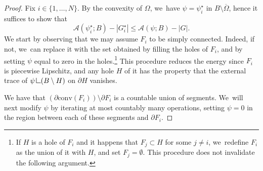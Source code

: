 \documentclass[11pt]{article}
\numberwithin{equation}{section}
\newcommand{\resa}{\mathop{\hbox{\vrule height 7pt width 0.5pt depth 0pt
\vrule height 0.5pt width 6pt depth 0pt}}\nolimits}
\newcommand{\resb}{\mathop{\hbox{\vrule height 4pt width 0.5pt depth 0pt
\vrule height 0.5pt width 3pt depth 0pt}}\nolimits}
\newcommand{\res}{\mathchoice{\resa}{\resa}{\resb}{\resb}}
\theoremstyle{definition}
\begin{document}
\begin{proof}
Fix $i\in\{1,\dots,N\}$.
By the convexity of $\Omega$, we~have $\psi=\psi_i^\star$ in $B\setminus \overline\Omega$, hence it suffices to show that
\begin{equation*}
\mathcal A(\psi_i^\star;B)-|G_i^\star|\leq\mathcal A(\psi;B)-|G|.
\end{equation*}
We start by observing that we may assume $F_i$ to be simply connected.
Indeed, if not, we~can replace it with the set obtained by filling the
holes of $F_i$, and by setting $\psi$ equal to zero in the holes.\footnote{If $H$ is a hole of $F_i$ and it happens that $F_j\subset H$ for some $j\neq i$, we~redefine $F_i$ as the union of it with $H$, and set $F_j=\emptyset$. This procedure does not invalidate the following argument.}
This procedure reduces the energy since $F_i$ is piecewise Lipschitz, and any hole $H$ of
it has the property that
the external trace of $\psi\res (B\setminus H)$ on $\partial H$ vanishes.

We have that $(\partial \mathrm{conv}(F_i))\setminus\partial F_i$ is a countable union of segments. We~will next modify $\psi$ by iterating at most countably many operations, setting $\psi=0$ in the region between each of these segments and $\partial F_i$.


\end{proof}
\end{document}
